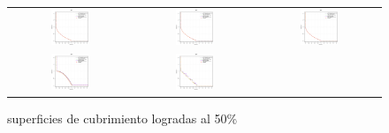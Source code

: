 \begin{figure}[H]
\caption{superficies de cubrimiento logradas al 50\%}%
\begin{tabular}{ccc}
  \includegraphics[width=0.33\textwidth]{Figures_Chapter7/Results_Chapter4/Surface_eps_VSD_MOEA/UF1.eps}  &
  \includegraphics[width=0.33\textwidth]{Figures_Chapter7/Results_Chapter4/Surface_eps_VSD_MOEA/UF2.eps} &
  \includegraphics[width=0.33\textwidth]{Figures_Chapter7/Results_Chapter4/Surface_eps_VSD_MOEA/UF3.eps} \\
  \includegraphics[width=0.33\textwidth]{Figures_Chapter7/Results_Chapter4/Surface_eps_VSD_MOEA/UF4.eps} &
  \includegraphics[width=0.33\textwidth]{Figures_Chapter7/Results_Chapter4/Surface_eps_VSD_MOEA/UF5.eps} &

\end{tabular}
\end{figure}
